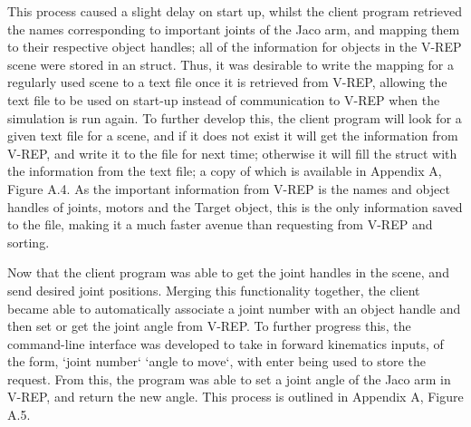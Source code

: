 \documentclass[12pt,openany,a4paper]{book}
\begin{document}


This process caused a slight delay on start up, whilst the client program retrieved the names corresponding to important joints of the Jaco arm, and mapping them to their respective object handles; all of the information for objects in the V-REP scene were stored in an struct. Thus, it was desirable to write the mapping for a regularly used scene to a text file once it is retrieved from V-REP, allowing the text file to be used on start-up instead of communication to V-REP when the simulation is run again. To further develop this, the client program will look for a given text file for a scene, and if it does not exist it will get the information from V-REP, and write it to the file for next time; otherwise it will fill the struct with the information from the text file; a copy of which is available in Appendix A, Figure A.4. As the important information from V-REP is the names and object handles of joints, motors and the Target object, this is the only information saved to the file, making it a much faster avenue than requesting from V-REP and sorting.

\vspace{\baselineskip}



Now that the client program was able to get the joint handles in the scene, and send desired joint positions. Merging this functionality together, the client became able to automatically associate a joint number with an object handle and then set or get the joint angle from V-REP. To further progress this, the command-line interface was developed to take in forward kinematics inputs, of the form, `joint number` `angle to move`, with enter being used to store the request. From this, the program was able to set a joint angle of the Jaco arm in V-REP, and return the new angle. This process is outlined in Appendix A, Figure A.5.
\end{document}
